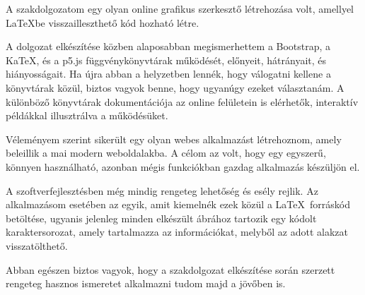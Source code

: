 
A szakdolgozatom egy olyan online grafikus szerkesztő létrehozása volt, amellyel \LaTeX\-be visszailleszthető kód hozható létre. 

A dolgozat elkészítése közben alaposabban megismerhettem a Bootstrap, a KaTeX, és a p5.js függvénykönyvtárak működését, előnyeit, hátrányait, és hiányosságait. Ha újra abban a helyzetben lennék, hogy válogatni kellene a könyvtárak közül, biztos vagyok benne, hogy ugyanúgy ezeket választanám. A különböző könyvtárak dokumentációja az online felületein is elérhetők, interaktív példákkal illusztrálva a működésüket.

Véleményem szerint sikerült egy olyan webes alkalmazást létrehoznom, amely beleillik a mai modern weboldalakba. A célom az volt, hogy egy egyszerű, könnyen használható, azonban mégis funkciókban gazdag alkalmazás készüljön el.



A szoftverfejlesztésben még mindig rengeteg lehetőség és esély rejlik. Az alkalmazásom esetében az egyik, amit kiemelnék ezek közül a \LaTeX\ forráskód betöltése, ugyanis jelenleg minden elkészült ábrához tartozik egy kódolt karaktersorozat, amely tartalmazza az információkat, melyből az adott alakzat visszatölthető.

Abban egészen biztos vagyok, hogy a szakdolgozat elkészítése során szerzett rengeteg hasznos ismeretet alkalmazni tudom majd a jövőben is.